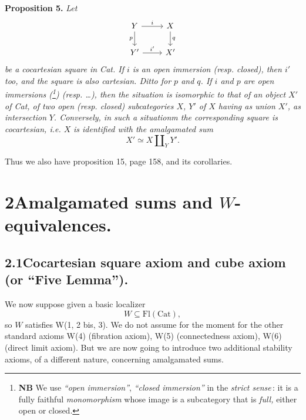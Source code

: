 \documentclass[11pt]{article}
\newcommand{\printedpage}[1]{\marginpar{\footnotesize p.~#1}}
\begin{document}
\textbf{Proposition 5.} \textit{Let}
\[
\begin{tikzcd}
Y \arrow[r, "i"] \arrow[d, "p"'] & X \arrow[d, "q"] \\
Y' \arrow[r, "i'"] & X'
\end{tikzcd}
\]
\printedpage{54}
\textit{be a cocartesian square in \textup{Cat}. If $i$ is an open immersion (resp. closed), then $i'$ too, and the square is also cartesian. Ditto for $p$ and $q$. If $i$ and $p$ are open immersions (\footnote{\textbf{NB} We use \textit{``open immersion''}, \textit{``closed immersion''} in the \textit{strict sense}\,: it is a fully faithful \textit{monomorphism} whose image is a subcategory that is \textit{full,} either open or closed.}) (resp. \dots), then the situation is isomorphic to that of an object $X'$ of \textup{Cat}, of two open (resp. closed) subcategories $X$, $Y'$ of $X$ having as union $X'$, as intersection} %
\textit{$Y$. Conversely, in such a situationm the corresponding square is cocartesian, i.e. $X$} %
 \textit{is identified with the amalgamated sum}
\[
X'\simeq X\amalg_{Y}Y'.
\]

Thus we also have proposition 15, page 158, and its corollaries.

\printedpage{55}

\section*{2\quad Amalgamated sums and $W$-equivalences.}

\subsection*{2.1\quad Cocartesian square axiom and cube axiom (or ``Five Lemma'').}

We now suppose given a basic localizer
\[
W\subseteq\mathrm{Fl}(\mathrm{Cat}),
\]
so $W$ satisfies W(1, 2 bis, 3). We do not assume for the moment for the other standard axioms W(4) (fibration axiom), W(5) (connectedness axiom), W(6) (direct limit axiom). But we are now going to introduce two additional stability axioms, of a different nature, concerning amalgamated sums.
\end{document}
